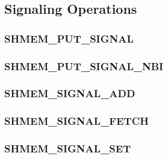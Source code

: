 \documentclass[10pt,oneside]{book}
\begin{document}
\label{subsec:shmem_atomic_fetch_add_nbi}


\label{subsec:shmem_atomic_fetch_and_nbi}


\label{subsec:shmem_atomic_fetch_or_nbi}


\label{subsec:shmem_atomic_fetch_xor_nbi}




\subsection{Signaling Operations}\label{sec:shmem_signal}


\subsubsection{\textbf{SHMEM\_PUT\_SIGNAL}}\label{subsec:shmem_put_signal}


\subsubsection{\textbf{SHMEM\_PUT\_SIGNAL\_NBI}}\label{subsec:shmem_put_signal_nbi}


\subsubsection{\textbf{SHMEM\_SIGNAL\_ADD}}\label{subsec:shmem_signal_add}


\subsubsection{\textbf{SHMEM\_SIGNAL\_FETCH}}\label{subsec:shmem_signal_fetch}


\subsubsection{\textbf{SHMEM\_SIGNAL\_SET}}\label{subsec:shmem_signal_set}

\end{document}
